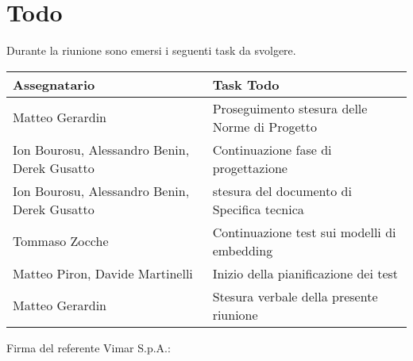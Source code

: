 \section{Todo}
Durante la riunione sono emersi i seguenti task da svolgere.

\begin{center}
  \begin{tabular}{|L{5cm}|L{8cm}|}
    \hline
    \textbf{Assegnatario} & \textbf{Task Todo} \\ \hline
      Matteo Gerardin & Proseguimento stesura delle Norme di Progetto \\
      \hline
      Ion Bourosu, Alessandro Benin, Derek Gusatto & Continuazione fase di progettazione \\ \hline
      Ion Bourosu, Alessandro Benin, Derek Gusatto & stesura del documento di Specifica tecnica \\ \hline
      Tommaso Zocche & Continuazione test sui modelli di embedding \\ \hline
      Matteo Piron, Davide Martinelli & Inizio della pianificazione dei test \\ \hline
      Matteo Gerardin & Stesura verbale della presente riunione \\ \hline
  \end{tabular}
\end{center}

\vspace{4cm}
\noindent Firma del referente Vimar S.p.A.: \underline{\hspace{5cm}}